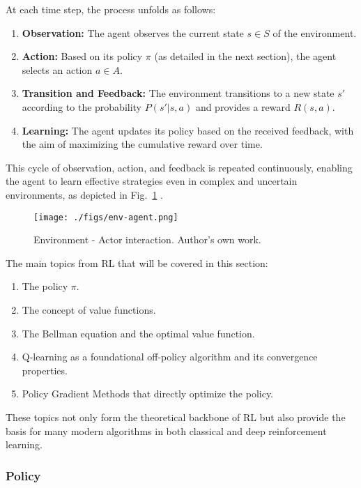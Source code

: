 \documentclass[12pt,a4paper,twoside,openany]{book}
\begin{document}
At each time step, the process unfolds as follows:
\begin{enumerate}
    \item \textbf{Observation:} The agent observes the current state \(s \in S\) of the environment.
    \item \textbf{Action:} Based on its policy \(\pi\) (as detailed in the next section), the agent selects an action \(a \in A\).
    \item \textbf{Transition and Feedback:} The environment transitions to a new state \(s'\) according to the probability \(P(s'|s,a)\) and provides a reward \(R(s,a)\).
    \item \textbf{Learning:} The agent updates its policy based on the received feedback, with the aim of maximizing the cumulative reward over time.
\end{enumerate}

This cycle of observation, action, and feedback is repeated continuously, enabling the agent to learn effective strategies even in complex and uncertain environments, as depicted in Fig.~\ref{fig:env-agent} .

\begin{figure}[H]
\centering
\texttt{[image: ./figs/env-agent.png]}
\captionsetup{font=small}
\caption{Environment - Actor interaction. Author's own work.}
\label{fig:env-agent}
\end{figure}

The main topics from RL that will be covered in this section:
\begin{enumerate}
    \item The policy \(\pi\).	
    \item The concept of value functions.
    \item The Bellman equation and the optimal value function.
    \item Q-learning as a foundational off-policy algorithm and its convergence properties.
    \item Policy Gradient Methods that directly optimize the policy.
\end{enumerate}
These topics not only form the theoretical backbone of RL but also provide the basis for many modern algorithms in both classical and deep reinforcement learning.

\subsubsection*{Policy}
\end{document}
